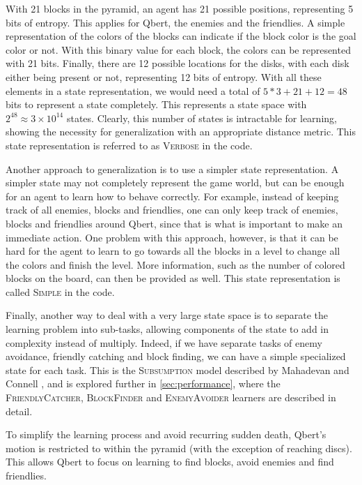 \documentclass[a4paper,titlepage]{article}
\begin{document}
	With 21 blocks in the pyramid, an agent has 21 possible positions, representing 5 bits of entropy. This applies for Qbert, the enemies and the friendlies. A simple representation of the colors of the blocks can indicate if the block color is the goal color or not. With this binary value for each block, the colors can be represented with 21 bits. Finally, there are 12 possible locations for the disks, with each disk either being present or not, representing 12 bits of entropy. With all these elements in a state representation, we would need a total of $5*3 + 21 + 12 = 48$ bits to represent a state completely. This represents a state space with $2^{48} \approx 3 \times 10^{14}$ states. Clearly, this number of states is intractable for learning, showing the necessity for generalization with an appropriate distance metric. This state representation is referred to as \textsc{Verbose} in the code.
	
	Another approach to generalization is to use a simpler state representation. A simpler state may not completely represent the game world, but can be enough for an agent to learn how to behave correctly. For example, instead of keeping track of all enemies, blocks and friendlies, one can only keep track of enemies, blocks and friendlies around Qbert, since that is what is important to make an immediate action. One problem with this approach, however, is that it can be hard for the agent to learn to go towards all the blocks in a level to change all the colors and finish the level. More information, such as the number of colored blocks on the board, can then be provided as well. This state representation is called \textsc{Simple} in the code.
	
	Finally, another way to deal with a very large state space is to separate the learning problem into sub-tasks, allowing components of the state to add in complexity instead of multiply. Indeed, if we have separate tasks of enemy avoidance, friendly catching and block finding, we can have a simple specialized state for each task. This is the \textsc{Subsumption} model described by Mahadevan and Connell \cite{mahadevan}, and is explored further in \cref{sec:performance}, where the \textsc{FriendlyCatcher}, \textsc{BlockFinder} and \textsc{EnemyAvoider} learners are described in detail.
	
	To simplify the learning process and avoid recurring sudden death, Qbert's motion is restricted to within the pyramid (with the exception of reaching discs). This allows Qbert to focus on learning to find blocks, avoid enemies and find friendlies.
	
\end{document}
